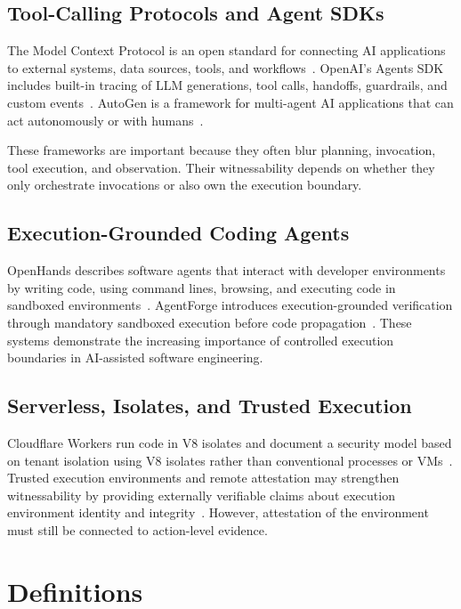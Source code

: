 \documentclass[11pt]{article}
\begin{document}
\subsection{Tool-Calling Protocols and Agent SDKs}
The Model Context Protocol is an open standard for connecting AI applications to external systems, data sources, tools, and workflows~\cite{mcp_intro,anthropic_mcp}. OpenAI's Agents SDK includes built-in tracing of LLM generations, tool calls, handoffs, guardrails, and custom events~\cite{openai_agents_tracing}. AutoGen is a framework for multi-agent AI applications that can act autonomously or with humans~\cite{autogen_repo,autogen_agent_chat}.

These frameworks are important because they often blur planning, invocation, tool execution, and observation. Their witnessability depends on whether they only orchestrate invocations or also own the execution boundary.

\subsection{Execution-Grounded Coding Agents}
OpenHands describes software agents that interact with developer environments by writing code, using command lines, browsing, and executing code in sandboxed environments~\cite{openhands_platform_2024,openhands_sdk_2025}. AgentForge introduces execution-grounded verification through mandatory sandboxed execution before code propagation~\cite{agentforge_2026}. These systems demonstrate the increasing importance of controlled execution boundaries in AI-assisted software engineering.

\subsection{Serverless, Isolates, and Trusted Execution}
Cloudflare Workers run code in V8 isolates and document a security model based on tenant isolation using V8 isolates rather than conventional processes or VMs~\cite{cloudflare_workers_how,cloudflare_workers_security}. Trusted execution environments and remote attestation may strengthen witnessability by providing externally verifiable claims about execution environment identity and integrity~\cite{attestable_builds_2025,zk_compilation_2026,evidence_ci_2026}. However, attestation of the environment must still be connected to action-level evidence.

\section{Definitions}
\end{document}
